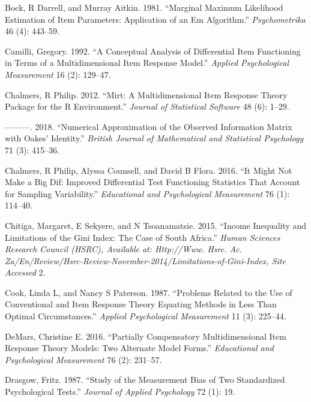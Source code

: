 \documentclass[
  11pt,
]{article}
\begin{document}
\leavevmode\hypertarget{ref-bock1981marginal}{}%
Bock, R Darrell, and Murray Aitkin. 1981. ``Marginal Maximum Likelihood Estimation of Item Parameters: Application of an Em Algorithm.'' \emph{Psychometrika} 46 (4): 443--59.

\leavevmode\hypertarget{ref-camilli1992conceptual}{}%
Camilli, Gregory. 1992. ``A Conceptual Analysis of Differential Item Functioning in Terms of a Multidimensional Item Response Model.'' \emph{Applied Psychological Measurement} 16 (2): 129--47.

\leavevmode\hypertarget{ref-chalmers2012mirt}{}%
Chalmers, R Philip. 2012. ``Mirt: A Multidimensional Item Response Theory Package for the R Environment.'' \emph{Journal of Statistical Software} 48 (6): 1--29.

\leavevmode\hypertarget{ref-chalmers2018numerical}{}%
---------. 2018. ``Numerical Approximation of the Observed Information Matrix with Oakes' Identity.'' \emph{British Journal of Mathematical and Statistical Psychology} 71 (3): 415--36.

\leavevmode\hypertarget{ref-chalmers2016might}{}%
Chalmers, R Philip, Alyssa Counsell, and David B Flora. 2016. ``It Might Not Make a Big Dif: Improved Differential Test Functioning Statistics That Account for Sampling Variability.'' \emph{Educational and Psychological Measurement} 76 (1): 114--40.

\leavevmode\hypertarget{ref-chitiga2015income}{}%
Chitiga, Margaret, E Sekyere, and N Tsoanamatsie. 2015. ``Income Inequality and Limitations of the Gini Index: The Case of South Africa.'' \emph{Human Sciences Research Council (HSRC), Available at: Http://Www. Hsrc. Ac. Za/En/Review/Hsrc-Review-November-2014/Limitations-of-Gini-Index, Site Accessed} 2.

\leavevmode\hypertarget{ref-cook1987problems}{}%
Cook, Linda L, and Nancy S Paterson. 1987. ``Problems Related to the Use of Conventional and Item Response Theory Equating Methods in Less Than Optimal Circumstances.'' \emph{Applied Psychological Measurement} 11 (3): 225--44.

\leavevmode\hypertarget{ref-demars2016partially}{}%
DeMars, Christine E. 2016. ``Partially Compensatory Multidimensional Item Response Theory Models: Two Alternate Model Forms.'' \emph{Educational and Psychological Measurement} 76 (2): 231--57.

\leavevmode\hypertarget{ref-drasgow1987study}{}%
Drasgow, Fritz. 1987. ``Study of the Measurement Bias of Two Standardized Psychological Tests.'' \emph{Journal of Applied Psychology} 72 (1): 19.
\end{document}

